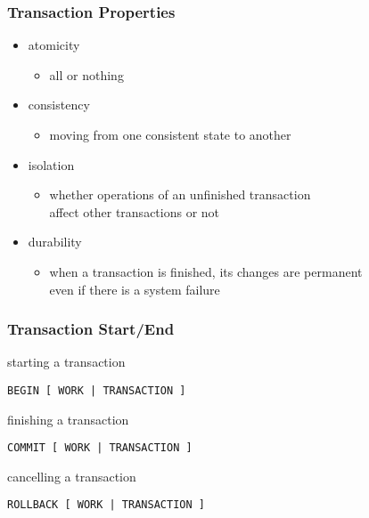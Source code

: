 \documentclass[dvipsnames]{beamer}
\theoremstyle{plain}
\begin{document}
\begin{frame}
  \frametitle{Transaction Properties}

  \begin{itemize}
    \item atomicity
    \begin{itemize}
      \item all or nothing
    \end{itemize}

    \pause
    \item consistency
    \begin{itemize}
      \item moving from one consistent state to another
    \end{itemize}

    \pause
    \item isolation
    \begin{itemize}
      \item whether operations of an unfinished transaction\\
	affect other transactions or not
    \end{itemize}

    \pause
    \item durability
    \begin{itemize}
      \item when a transaction is finished, its changes are permanent\\
	even if there is a system failure
    \end{itemize}
  \end{itemize}
\end{frame}

\begin{frame}[fragile]
  \frametitle{Transaction Start/End}

  \begin{block}{starting a transaction}
    \begin{lstlisting}
BEGIN [ WORK | TRANSACTION ]
    \end{lstlisting}
  \end{block}

  \pause
  \begin{block}{finishing a transaction}
    \begin{lstlisting}
COMMIT [ WORK | TRANSACTION ]
    \end{lstlisting}
  \end{block}

  \pause
  \begin{block}{cancelling a transaction}
    \begin{lstlisting}
ROLLBACK [ WORK | TRANSACTION ]
    \end{lstlisting}
  \end{block}
\end{frame}
\end{document}
